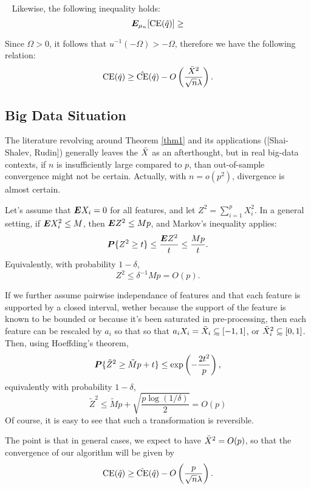 \documentclass[10pt]{article}
\begin{document}
\begin{thm}\
  \label{thm4}
  Likewise, the following inequality holds:
  \[
    \bm E_{\mu_n}[\operatorname{CE}(\hat q)] \geq 
  \]
\end{thm}

Since $\Omega>0$, it follows that $u^{-1}(-\Omega) > -\Omega$, therefore we have the
following relation:
\[
  \operatorname{CE}(\hat q) \geq \hat{\operatorname{CE}}(\hat q) - O\left(\frac{\bar X^2}{\sqrt{n}\lambda}\right).
\]


\subsection{Big Data Situation}

The literature revolving around Theorem \ref{thm1} and its applications ([Shai-Shalev,
Rudin]) generally leaves the $\bar X$ as an afterthought, but in real big-data contexts, if
$n$ is insufficiently large compared to $p$, than out-of-sample convergence might not be
certain. Actually, with $n=o(p^2)$, divergence is almost certain. 

Let's assume that $\bm E X_i = 0$ for all features, and let $Z^2 = \sum_{i=1}^p X_i^2$. In a
general setting, if $\bm E X_i^2 \leq M$, then $\bm E Z^2 \leq Mp$, and Markov's inequality
applies:
\[
  \bm P\{Z^2 \geq t\} \leq \frac{\bm E Z^2}{t} \leq \frac{Mp}{t}.
\]
Equivalently, with probability $1-\delta$, 
\[
  Z^2 \leq \delta^{-1}Mp = O(p).
\]

If we further assume pairwise independance of features and that each feature is supported
by a closed interval, wether because the support of the feature is known to be bounded or
because it's been saturated in pre-processing, then each feature can be rescaled by $a_i$
so that so that $a_iX_i = \tilde X_i \subsetsim[-1,1]$, or $\tilde X_i^2
\subsetsim[0,1]$. Then, using Hoeffding's theorem,
\[
  \bm P\{\tilde Z^2 \geq \tilde Mp + t\} \leq \exp\left(-\frac{2t^2}{p}\right),
\]
equivalently with probability $1-\delta$, 
\[
  \tilde Z^2 \leq \tilde Mp + \sqrt{\frac{p\log(1/\delta)}{2}} = O(p)
\]
Of course, it is easy to see that such a transformation is reversible. 

The point is that in general cases, we expect to have $\bar X^2 =O(p)$, so that the
convergence of our algorithm will be given by 
\[
  \operatorname{CE}(\hat q) \geq \hat{\operatorname{CE}}(\hat q) - O\left(\frac{p}{\sqrt{n}\lambda}\right).
\]




\printbibliography
\end{document}
